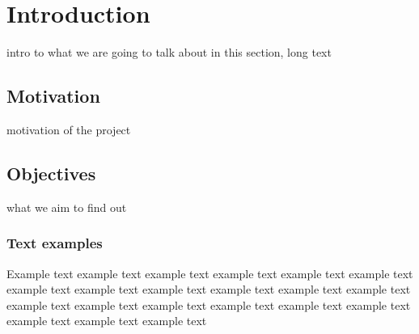 \section{Introduction}
intro to what we are going to talk about in this section, long text
\subsection{Motivation}
motivation of the project
\subsection{Objectives}
what we aim to find out

\subsubsection{Text examples}
Example text example text example text example text example text example text example text
example text example text example text example text example text example text example text
example text example text example text example text example text example text example text

\pagebreak